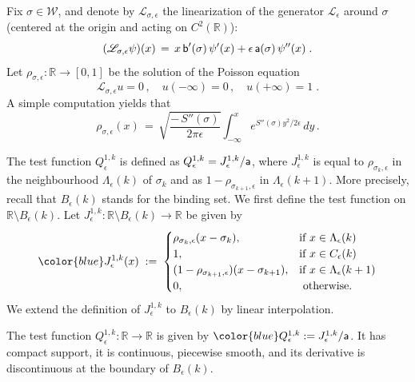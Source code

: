 \documentclass[reqno]{amsart}
\theoremstyle{plain}
\theoremstyle{definition}
\newcommand{\mc}[1]{{\mathcal #1}}
\newcommand{\bb}[1]{{\mathbb #1}}
\newcommand{\ms}[1]{{\mathscr #1}}
\newcommand{\mss}[1]{{\textsf #1}}
\newcounter{as}[section]
\newcommand{\<}{\langle}
\renewcommand{\>}{\rangle}
\begin{document}
Fix $\sigma \in \mc W$, and denote by $\ms L_{\sigma, \epsilon}$ the
linearization of the generator $\ms L_\epsilon$ around $\sigma$
(centered at the origin and acting on $C^2(\bb R)$):
\begin{equation}
\label{18}
(\ms L_{\sigma, \epsilon} \psi) (x)\,=\, 
x \, \mss b'(\sigma) \, \psi '(x)
+ \epsilon \, \mss a(\sigma) \, \psi ''(x)\;.
\end{equation}
Let $\rho_{\sigma,\epsilon}\colon \bb R \to [0,1]$ be the solution of
the Poisson equation
\begin{equation*}
\ms L_{\sigma, \epsilon} u =0\,,\quad u(-\infty)=0\,,\quad
u(+\infty)=1\;.
\end{equation*}
A simple computation yields that
\begin{equation}
\label{13}
\rho_{\sigma, \epsilon}(x) \,=\,
\sqrt{\frac{-\, S''(\sigma)}{2\pi\epsilon}}
\int_{-\infty}^{x}e^{S''(\sigma) y^{2}/2 \epsilon } \,dy\,.
\end{equation}

The test function $Q_{\epsilon}^{1,k}$ is defined as
$Q_{\epsilon}^{1,k} = J_{\epsilon}^{1,k}/\mss a$, where
$ J_{\epsilon}^{1,k}$ is equal to $\rho_{\sigma_k, \epsilon}$ in the
neighbourhood $\Lambda_ {\epsilon}(k)$ of $\sigma_k$ and as
$1 - \rho_{\sigma_{k+1}, \epsilon}$ in $\Lambda_ {\epsilon}(k+1)$. More
precisely, recall that $B_{\epsilon}(k)$ stands for the binding
set. We first define the test function on
$\bb R \setminus B_{\epsilon}(k)$. Let
$J_{\epsilon}^{1,k}\colon \bb R \setminus B_{\epsilon}(k) \to \bb R$
be given by
\begin{equation}
\label{12}
{\color{blue} J_{\epsilon}^{1,k}(x) } \;:=\;
\begin{cases} \rho_{\sigma_k,\epsilon} (x-\sigma_k),
&\text{if } x\in \Lambda_{\epsilon}(k)
\\
1 , &\text{if } x\in C_{\epsilon}(k)
\\
(1 - \rho_{\sigma_{k+1},\epsilon})  (x- \sigma_{k+1}), &\text{if }
x\in \Lambda_ {\epsilon}(k+1)
\\
0, &\text{ otherwise. }
\end{cases}
\end{equation} 
We extend the definition of $J_{\epsilon}^{1,k}$ to $B_{\epsilon}(k)$
by linear interpolation. 

The test function $Q_{\epsilon}^{1,k} \colon \bb R \to \bb R$ is given
by $\color{blue} Q_{\epsilon}^{1,k} := J_{\epsilon}^{1,k}/\mss a$.  It
has compact support, it is continuous, piecewise smooth, and its
derivative is discontinuous at the boundary of $B_{\epsilon}(k)$.
\end{document}
